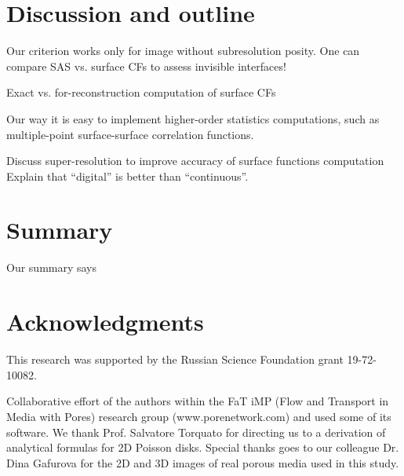 \documentclass[reprint,amsmath,amssymb,aps,pre,showkeys,showpacs]{revtex4-1}
\begin{document}
\section{Discussion and outline}
\label{sec:outline}
Our criterion works only for image without subresolution posity. One can compare
SAS vs. surface CFs to assess invisible interfaces!

Exact vs. for-reconstruction computation of surface CFs

Our way it is easy to implement higher-order statistics computations, such as
multiple-point surface-surface correlation functions.

Discuss super-resolution to improve accuracy of surface functions computation
Explain that ``digital'' is better than ``continuous''.

\section{Summary}
\label{sec:summary}
Our summary says

\section{Acknowledgments}
This research was supported by the Russian Science Foundation grant
19-72-10082.

Collaborative effort of the authors within the FaT iMP (Flow and Transport in
Media with Pores) research group (www.porenetwork.com) and used some of its
software. We thank Prof. Salvatore Torquato for directing us to a
derivation of analytical formulas for 2D Poisson disks. Special thanks goes to
our colleague Dr. Dina Gafurova for the 2D and 3D images of real porous media
used in this study.

\appendix
\end{document}
